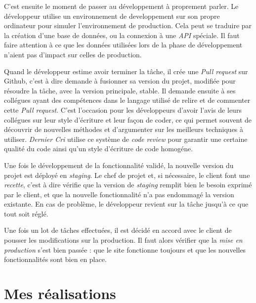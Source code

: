\documentclass[12pt,a4paper]{article}
\begin{document}
  \bigskip

  C'est ensuite le moment de passer au développement à proprement parler.
  Le développeur utilise un environnement de developpement sur son propre
  ordinateur pour simuler l'environnement de production. Cela peut se
  traduire par la création d'une base de données, ou la connexion à une
  \emph{API} spéciale. Il faut faire attention à ce que les données
  utilisées lors de la phase de développement n'aient pas d'impact sur
  celles de production.

  \bigskip

  Quand le développeur estime avoir terminer la tâche, il crée une
  \emph{Pull request} sur Github, c'est à dire demande à fusionner sa
  version du projet, modifiée pour résoudre la tâche, avec la version
  principale, stable. Il demande ensuite à ses collégues ayant des
  compétences dans le langage utilisé de relire et de commenter cette
  \emph{Pull request}. C'est l'occasion pour les développeurs d'avoir
  l'avis de leurs collégues sur leur style d'écriture et leur façon de
  coder, ce qui permet souvent de découvrir de nouvelles méthodes et
  d'argumenter sur les meilleurs techniques à utiliser. \emph{Dernier Cri}
  utilise ce système de \emph{code review} pour garantir une certaine
  qualité du code ainsi qu'un style d'écriture de code homogéne.

  \bigskip

  Une fois le développement de la fonctionnalité validé, la nouvelle
  version du projet est déployé en \emph{staging}. Le chef de projet et,
  si nécessaire, le client font une \emph{recette}, c'est à dire vérifie
  que la version de \emph{staging} remplit bien le besoin exprimé par le
  client, et que la nouvelle fonctionnalité n'a pas endommagé la version
  existante. En cas de problème, le développeur revient sur la tâche
  jusqu'à ce que tout soit réglé.

  \bigskip

  Une fois un lot de tâches effectuées, il est décidé en accord avec le
  client de pousser les modifications sur la production. Il faut alors
  vérifier que la \emph{mise en production} s'est bien passée : que le
  site fonctionne toujours et que les nouvelles fonctionnalités sont bien
  en place.

  \newpage

  \section{Mes réalisations}\label{mes-ruxe9alisations}
\end{document}
